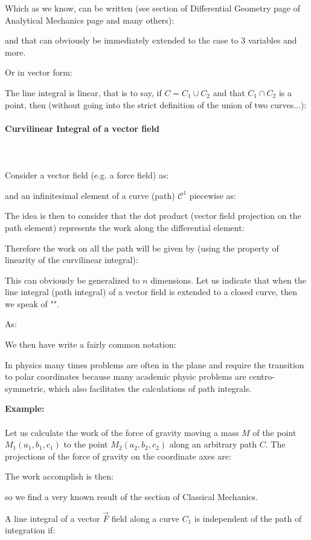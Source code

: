 	Which as we know, can be written (see section of Differential Geometry page \pageref{curvilinear abscissa helix} of Analytical Mechanics page \pageref{parametric curve length} and many others):
	
	and that can obviously be immediately extended to the case to 3 variables and more.
	
	Or in vector form:
	
	The line integral is linear, that is to say, if $C=C_1 \cup C_2$ and that $C_1 \cap C_2$ is a point, then (without going into the strict definition of the union of two curves...):
	
	
	\paragraph{Curvilinear Integral of a vector field}\mbox{}\\\\
	Consider a vector field (e.g. a force field) as:
	
	and an infinitesimal element of a curve (path) $\mathcal{C}^1$ piecewise as:
	
	The idea is then to consider that the dot product (vector field projection on the path element) represents the work along the differential element:
	
	Therefore the work on all the path will be given by (using the property of linearity of the curvilinear integral):
	
	This can obviously be generalized to $n$ dimensions. Let us indicate that when the line integral (path integral) of a vector field is extended to a closed curve, then we speak of "".
	
	As:
	
	We then have write a fairly common notation:
	
	\begin{tcolorbox}[title=Remark,colframe=black,arc=10pt]
	In physics many times problems are often in the plane and require the transition to polar coordinates because many academic physic problems are centro-symmetric, which also facilitates the calculations of path integrals.
	\end{tcolorbox}
	
	\begin{tcolorbox}[colframe=black,colback=white,sharp corners]
	\textbf{{\Large {}}Example:}\\\\
	Let us calculate the work of the force of gravity moving a mass $M$ of the point $M_1(a_1,b_1,c_1)$ to the point $M_2(a_2,b_2,c_2)$ along an arbitrary path $C$. The projections of the force of gravity on the coordinate axes are:
	
	The work accomplish is then:
	
	so we find a very known result of the section of Classical Mechanics.
	\end{tcolorbox}
	A line integral of a vector $\vec{F}$ field along a curve $C_1$ is independent of the path of integration if:
	

